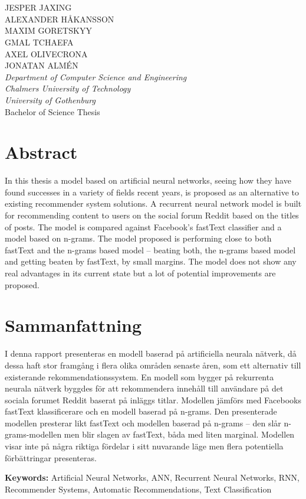 \large
\begin{flushleft}
\textbf{\varthetitle}\\
\varthesubtitle\\[0.7cm]
\end{flushleft}
JESPER JAXING\\
ALEXANDER HÅKANSSON\\
MAXIM GORETSKYY\\
GMAL TCHAEFA\\
AXEL OLIVECRONA\\
JONATAN ALMÉN\\
\normalsize
\textit{Department of Computer Science and Engineering\\
Chalmers University of Technology\\
University of Gothenburg}\\[0.7cm]
Bachelor of Science Thesis
\setlength{\parskip}{0.5cm}

\thispagestyle{plain}			%
\setlength{\parskip}{0pt plus 1.0pt}
\section*{Abstract}
In this thesis a model based on artificial neural networks, seeing how they have found successes in a variety of fields recent years, is proposed as an alternative to existing recommender system solutions. A recurrent neural network model is built for recommending content to users on the social forum Reddit based on the titles of posts. The model is compared against Facebook's fastText classifier and a model based on n-grams. The model proposed is performing close to both fastText and the n-grams based model -- beating both, the n-grams based model and getting beaten by fastText, by small margins. The model does not show any real advantages in its current state but a lot of potential improvements are proposed.

\section*{Sammanfattning}
I denna rapport presenteras en modell baserad på artificiella neurala nätverk, då dessa haft stor framgång i flera olika områden senaste åren, som ett alternativ till existerande rekommendationssystem. En modell som bygger på rekurrenta neurala nätverk byggdes för att rekommendera innehåll till användare på det sociala forumet Reddit baserat på inläggs titlar. Modellen jämförs med Facebooks fastText klassificerare och en modell baserad på n-grams. Den presenterade modellen presterar likt fastText och modellen baserad på n-grams -- den slår n-grams-modellen men blir slagen av fastText, båda med liten marginal. Modellen visar inte på några riktiga fördelar i sitt nuvarande läge men flera potentiella förbättringar presenteras.

\vfill
\textbf{Keywords:} Artificial Neural Networks, ANN, Recurrent Neural Networks, RNN, Recommender Systems, Automatic Recommendations, Text Classification

\newpage				%
\thispagestyle{empty}
\mbox{}